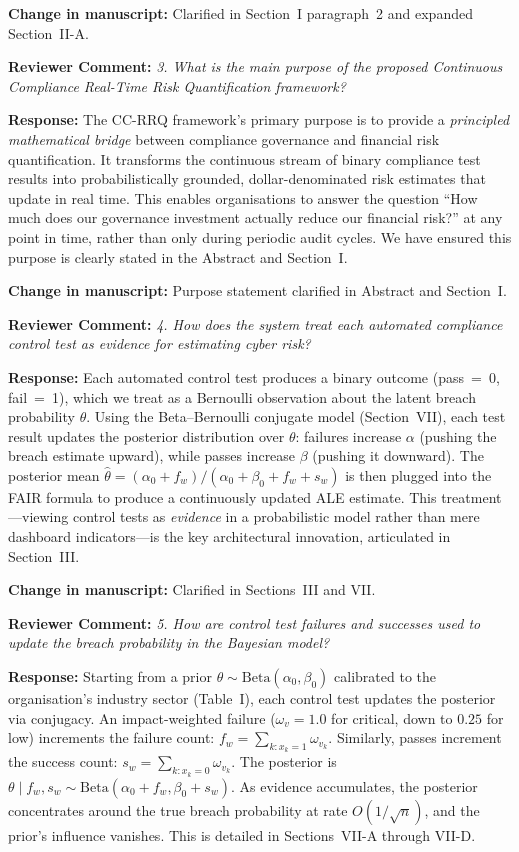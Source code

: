 \documentclass[11pt]{article}
\newcommand{\RC}[1]{\medskip\noindent\textbf{\color{reviewer}Reviewer Comment:} \textit{#1}\par\medskip}
\newcommand{\RE}[1]{\noindent\textbf{\color{response}Response:} #1\par}
\newcommand{\CH}[1]{\noindent\textbf{\color{change}Change in manuscript:} #1\par\medskip}
\begin{document}
\CH{Clarified in Section~I paragraph~2 and expanded Section~II-A.}

\RC{3. What is the main purpose of the proposed Continuous Compliance Real-Time Risk Quantification framework?}

\RE{The CC-RRQ framework's primary purpose is to provide a \emph{principled mathematical bridge} between compliance governance and financial risk quantification. It transforms the continuous stream of binary compliance test results into probabilistically grounded, dollar-denominated risk estimates that update in real time. This enables organisations to answer the question ``How much does our governance investment actually reduce our financial risk?'' at any point in time, rather than only during periodic audit cycles. We have ensured this purpose is clearly stated in the Abstract and Section~I.}

\CH{Purpose statement clarified in Abstract and Section~I.}

\RC{4. How does the system treat each automated compliance control test as evidence for estimating cyber risk?}

\RE{Each automated control test produces a binary outcome (pass~=~0, fail~=~1), which we treat as a Bernoulli observation about the latent breach probability $\theta$. Using the Beta--Bernoulli conjugate model (Section~VII), each test result updates the posterior distribution over $\theta$: failures increase $\alpha$ (pushing the breach estimate upward), while passes increase $\beta$ (pushing it downward). The posterior mean $\hat\theta = (\alpha_0+f_w)/(\alpha_0+\beta_0+f_w+s_w)$ is then plugged into the FAIR formula to produce a continuously updated ALE estimate. This treatment---viewing control tests as \emph{evidence} in a probabilistic model rather than mere dashboard indicators---is the key architectural innovation, articulated in Section~III.}

\CH{Clarified in Sections~III and VII.}

\RC{5. How are control test failures and successes used to update the breach probability in the Bayesian model?}

\RE{Starting from a prior $\theta \sim \mathrm{Beta}(\alpha_0, \beta_0)$ calibrated to the organisation's industry sector (Table~I), each control test updates the posterior via conjugacy. An impact-weighted failure ($\omega_v = 1.0$ for critical, down to $0.25$ for low) increments the failure count: $f_w = \sum_{k:x_k=1} \omega_{v_k}$. Similarly, passes increment the success count: $s_w = \sum_{k:x_k=0} \omega_{v_k}$. The posterior is $\theta \mid f_w, s_w \sim \mathrm{Beta}(\alpha_0 + f_w, \beta_0 + s_w)$. As evidence accumulates, the posterior concentrates around the true breach probability at rate $O(1/\sqrt{n})$, and the prior's influence vanishes. This is detailed in Sections~VII-A through VII-D.}
\end{document}
